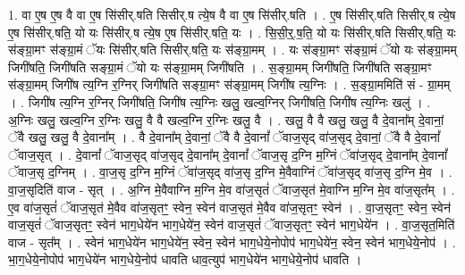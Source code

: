 \documentclass[17pt]{extarticle}
\begin{document}
1. वा ए॒ष ए॒ष वै वा ए॒ष सि॑सीर्.षति सिसीर्.ष त्ये॒ष वै वा ए॒ष सि॑सीर्.षति । . ए॒ष सि॑सीर्.षति सिसीर्.ष त्ये॒ष ए॒ष सि॑सीर्.षति॒ यो यः सि॑सीर्.ष त्ये॒ष ए॒ष सि॑सीर्.षति॒ यः । . सि॒सी॒र्॒.ष॒ति॒ यो यः सि॑सीर्.षति सिसीर्.षति॒ यः स॑ङ्ग्रा॒मꣳ स॑ङ्ग्रा॒मं ॅयः सि॑सीर्.षति सिसीर्.षति॒ यः स॑ङ्ग्रा॒मम् । . यः स॑ङ्ग्रा॒मꣳ स॑ङ्ग्रा॒मं ॅयो यः स॑ङ्ग्रा॒मम् जिगी॑षति॒ जिगी॑षति सङ्ग्रा॒मं ॅयो यः स॑ङ्ग्रा॒मम् जिगी॑षति । . स॒ङ्ग्रा॒मम् जिगी॑षति॒ जिगी॑षति सङ्ग्रा॒मꣳ स॑ङ्ग्रा॒मम् जिगी॑ष त्य॒ग्नि र॒ग्निर् जिगी॑षति सङ्ग्रा॒मꣳ स॑ङ्ग्रा॒मम् जिगी॑ष त्य॒ग्निः । . स॒ङ्ग्रा॒ममिति॑ सं - ग्रा॒मम् । . जिगी॑ष त्य॒ग्नि र॒ग्निर् जिगी॑षति॒ जिगी॑ष त्य॒ग्निः खलु॒ खल्व॒ग्निर् जिगी॑षति॒ जिगी॑ष त्य॒ग्निः खलु॑ । . अ॒ग्निः खलु॒ खल्व॒ग्नि र॒ग्निः खलु॒ वै वै खल्व॒ग्नि र॒ग्निः खलु॒ वै । . खलु॒ वै वै खलु॒ खलु॒ वै दे॒वाना᳚म् दे॒वानां॒ ॅवै खलु॒ खलु॒ वै दे॒वाना᳚म् । . वै दे॒वाना᳚म् दे॒वानां॒ ॅवै वै दे॒वानां᳚ ॅवाज॒सृद् वा॑ज॒सृद् दे॒वानां॒ ॅवै वै दे॒वानां᳚ ॅवाज॒सृत् । . दे॒वानां᳚ ॅवाज॒सृद् वा॑ज॒सृद् दे॒वाना᳚म् दे॒वानां᳚ ॅवाज॒सृ द॒ग्नि म॒ग्निं ॅवा॑ज॒सृद् दे॒वाना᳚म् दे॒वानां᳚ ॅवाज॒सृ द॒ग्निम् । . वा॒ज॒सृ द॒ग्नि म॒ग्निं ॅवा॑ज॒सृद् वा॑ज॒सृ द॒ग्नि मे॒वैवाग्निं ॅवा॑ज॒सृद् वा॑ज॒सृ द॒ग्नि मे॒व । . वा॒ज॒सृदिति॑ वाज - सृत् । . अ॒ग्नि मे॒वैवाग्नि म॒ग्नि मे॒व वा॑ज॒सृतं॑ ॅवाज॒सृत॑ मे॒वाग्नि म॒ग्नि मे॒व वा॑ज॒सृत᳚म् । . ए॒व वा॑ज॒सृतं॑ ॅवाज॒सृत॑ मे॒वैव वा॑ज॒सृतꣳ॒॒ स्वेन॒ स्वेन॑ वाज॒सृत॑ मे॒वैव वा॑ज॒सृतꣳ॒॒ स्वेन॑ । . वा॒ज॒सृतꣳ॒॒ स्वेन॒ स्वेन॑ वाज॒सृतं॑ ॅवाज॒सृतꣳ॒॒ स्वेन॑ भाग॒धेये॑न भाग॒धेये॑न॒ स्वेन॑ वाज॒सृतं॑ ॅवाज॒सृतꣳ॒॒ स्वेन॑ भाग॒धेये॑न । . वा॒ज॒सृत॒मिति॑ वाज - सृत᳚म् । . स्वेन॑ भाग॒धेये॑न भाग॒धेये॑न॒ स्वेन॒ स्वेन॑ भाग॒धेये॒नोपोप॑ भाग॒धेये॑न॒ स्वेन॒ स्वेन॑ भाग॒धेये॒नोप॑ । . भा॒ग॒धेये॒नोपोप॑ भाग॒धेये॑न भाग॒धेये॒नोप॑ धावति धाव॒त्युप॑ भाग॒धेये॑न भाग॒धेये॒नोप॑ धावति । \newline
\end{document}
